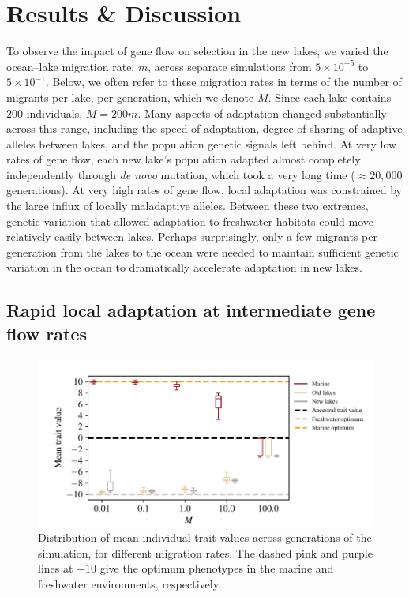 \documentclass{article}
\begin{document}
\section*{Results \& Discussion}

To observe the impact of gene flow on selection in the new lakes, we varied the ocean--lake migration rate, $m$, across separate simulations from $5 \times 10^{-5}$ to $5 \times 10^{-1}$. 
Below, we often refer to these migration rates in terms of the number of migrants per lake, per generation, which we denote $M$. Since each lake contains 200 individuals, $M=200m$. 
Many aspects of adaptation changed substantially across this range, including the speed of adaptation, degree of sharing of adaptive alleles between lakes, and the population genetic signals left behind. 
At very low rates of gene flow, each new lake's population adapted almost completely independently through \emph{de novo} mutation, which took a very long time ($\approx 20,000$ generations). 
At very high rates of gene flow, local adaptation was constrained by the large influx of locally maladaptive alleles. %
Between these two extremes, genetic variation that allowed adaptation to freshwater habitats could move relatively easily between lakes. 
Perhaps surprisingly, only a few migrants per generation from the lakes to the ocean were needed to maintain sufficient genetic variation in the ocean to dramatically accelerate adaptation in new lakes.

\subsection*{Rapid local adaptation at intermediate gene flow rates}

\begin{figure}
    \begin{center}
          \includegraphics{Final_Plots/Pheno_Dist.pdf}
          \caption{
            Distribution of mean individual trait values across generations of the simulation,
            for different migration rates.
            The dashed pink and purple lines at $\pm 10$ give the optimum phenotypes
            in the marine and freshwater environments, respectively.
        }
          \label{fig:MeanPhenotype}
    \end{center}
\end{figure}
\end{document}
